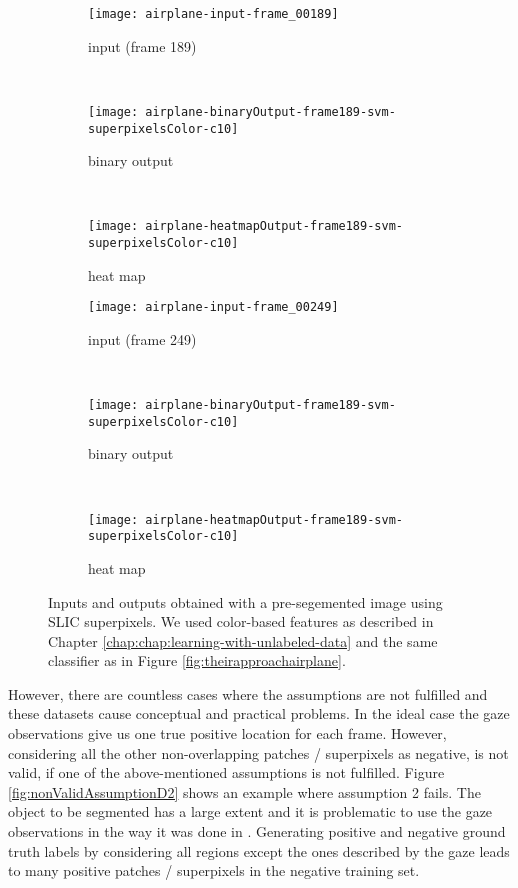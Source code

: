 \begin{figure}[ht]
	\centering
	\begin{subfigure}[h]{0.31\textwidth}
		\texttt{[image: airplane-input-frame\_00189]}
		\caption*{input (frame 189)}
	\end{subfigure}
	~
	\begin{subfigure}[h]{0.31\textwidth}
		\texttt{[image: airplane-binaryOutput-frame189-svm-superpixelsColor-c10]}	
		\caption*{binary output}
	\end{subfigure}
	~
	\begin{subfigure}[h]{0.31\textwidth}
		\texttt{[image: airplane-heatmapOutput-frame189-svm-superpixelsColor-c10]}	
		\caption*{heat map}
	\end{subfigure}
	
	\vspace{3mm}
	\begin{subfigure}[h]{0.31\textwidth}
		\texttt{[image: airplane-input-frame\_00249]}	
		\caption*{input (frame 249)}
	\end{subfigure}
	~
	\begin{subfigure}[h]{0.31\textwidth}
		\texttt{[image: airplane-binaryOutput-frame189-svm-superpixelsColor-c10]}	
		\caption*{binary output}
	\end{subfigure}	
	~
	\begin{subfigure}[h]{0.31\textwidth}
		\texttt{[image: airplane-heatmapOutput-frame189-svm-superpixelsColor-c10]}	
		\caption*{heat map}
	\end{subfigure}	
	\caption{Inputs and outputs obtained with a pre-segemented image using SLIC superpixels. We used color-based features as described in Chapter \ref{chap:chap:learning-with-unlabeled-data} and the same classifier as in Figure \ref{fig:theirapproachairplane}.}
	\label{fig:airplaneSLIC}
\end{figure}

However, there are countless cases where the assumptions are not fulfilled and these datasets cause conceptual and practical problems. 
In the ideal case the gaze observations give us one true positive location for each frame. 
However, considering all the other non-overlapping patches / superpixels as negative, is not valid, if one of the above-mentioned assumptions is not fulfilled.
Figure \ref{fig:nonValidAssumptionD2} shows an example where assumption 2 fails. The object to be segmented has a large extent and it is problematic to use the gaze observations in the way it was done in \cite{vilarino2007automatic}. Generating positive and negative ground truth labels by considering all regions except the ones described by the gaze leads to many positive patches / superpixels in the negative training set.

